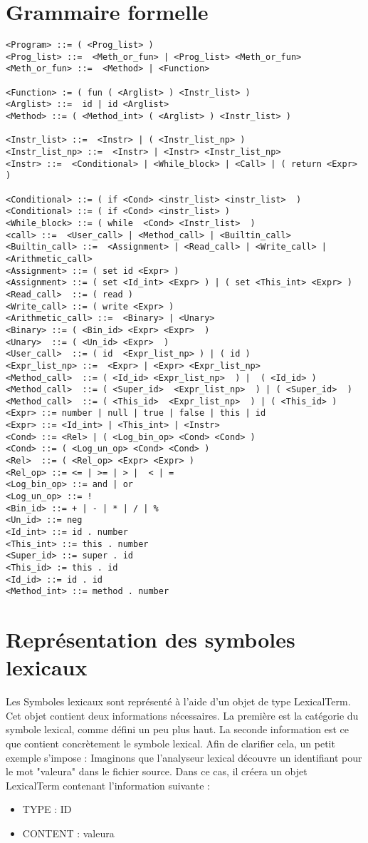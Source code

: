 \section{Grammaire formelle}
\begin{verbatim}
<Program> ::= ( <Prog_list> )
<Prog_list> ::=  <Meth_or_fun> | <Prog_list> <Meth_or_fun>	
<Meth_or_fun> ::=  <Method> | <Function>

<Function> := ( fun ( <Arglist> ) <Instr_list> ) 
<Arglist> ::=  id | id <Arglist>
<Method> ::= ( <Method_int> ( <Arglist> ) <Instr_list> )
 
<Instr_list> ::=  <Instr> | ( <Instr_list_np> ) 
<Instr_list_np> ::=  <Instr> | <Instr> <Instr_list_np>
<Instr> ::=  <Conditional> | <While_block> | <Call> | ( return <Expr> ) 

<Conditional> ::= ( if <Cond> <instr_list> <instr_list>  )  
<Conditional> ::= ( if <Cond> <instr_list> )
<While_block> ::= ( while  <Cond> <Instr_list>  ) 
<call> ::=  <User_call> | <Method_call> | <Builtin_call> 
<Builtin_call> ::=  <Assignment> | <Read_call> | <Write_call> | <Arithmetic_call>
<Assignment> ::= ( set id <Expr> ) 
<Assignment> ::= ( set <Id_int> <Expr> ) | ( set <This_int> <Expr> )
<Read_call>  ::= ( read )
<Write_call> ::= ( write <Expr> )
<Arithmetic_call> ::=  <Binary> | <Unary>
<Binary> ::= ( <Bin_id> <Expr> <Expr>  )
<Unary>  ::= ( <Un_id> <Expr>  )
<User_call>  ::= ( id  <Expr_list_np> ) | ( id ) 
<Expr_list_np> ::=  <Expr> | <Expr> <Expr_list_np>
<Method_call>  ::= ( <Id_id> <Expr_list_np>  ) |  ( <Id_id> )   
<Method_call>  ::= ( <Super_id>  <Expr_list_np>  ) | ( <Super_id>  )
<Method_call>  ::= ( <This_id>  <Expr_list_np>  ) | ( <This_id> )
<Expr> ::= number | null | true | false | this | id 
<Expr> ::= <Id_int> | <This_int> | <Instr>
<Cond> ::= <Rel> | ( <Log_bin_op> <Cond> <Cond> )
<Cond> ::= ( <Log_un_op> <Cond> <Cond> )
<Rel>  ::= ( <Rel_op> <Expr> <Expr> ) 
<Rel_op> ::= <= | >= | > |  < | =
<Log_bin_op> ::= and | or
<Log_un_op> ::= !
<Bin_id> ::= + | - | * | / | %
<Un_id> ::= neg
<Id_int> ::= id . number
<This_int> ::= this . number
<Super_id> ::= super . id
<This_id> := this . id 
<Id_id> ::= id . id
<Method_int> ::= method . number
\end{verbatim}


\section{Représentation des symboles lexicaux}

Les Symboles lexicaux sont représenté à l'aide d'un objet de type LexicalTerm. Cet objet contient deux informations nécessaires. La première est la catégorie du symbole lexical, comme défini un peu plus haut. La seconde information est ce que contient concrètement le symbole lexical.
Afin de clarifier cela, un petit exemple s'impose : 
Imaginons que l'analyseur lexical découvre un identifiant pour le mot  "valeura" dans le fichier source. Dans ce cas, il créera un objet LexicalTerm contenant l'information suivante :
\begin{itemize}
\item TYPE : ID
\item CONTENT : valeura
\end{itemize}

